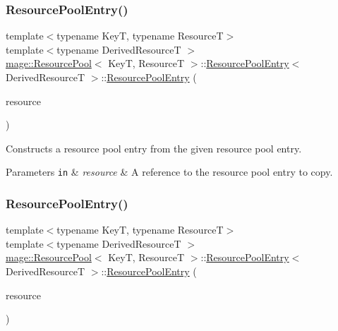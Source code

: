 \subsubsection{\texorpdfstring{Resource\+Pool\+Entry()}{ResourcePoolEntry()}\hspace{0.1cm}{\footnotesize\ttfamily [2/3]}}
{\footnotesize\ttfamily template$<$typename KeyT, typename ResourceT$>$ \\
template$<$typename Derived\+ResourceT $>$ \\
\hyperlink{classmage_1_1_resource_pool}{mage\+::\+Resource\+Pool}$<$ KeyT, ResourceT $>$\+::\hyperlink{structmage_1_1_resource_pool_1_1_resource_pool_entry}{Resource\+Pool\+Entry}$<$ Derived\+ResourceT $>$\+::\hyperlink{structmage_1_1_resource_pool_1_1_resource_pool_entry}{Resource\+Pool\+Entry} (\begin{DoxyParamCaption}\item[{const \hyperlink{structmage_1_1_resource_pool_1_1_resource_pool_entry}{Resource\+Pool\+Entry}$<$ Derived\+ResourceT $>$ \&}]{resource }\end{DoxyParamCaption})\hspace{0.3cm}{\ttfamily [delete]}}

Constructs a resource pool entry from the given resource pool entry.


\begin{DoxyParams}[1]{Parameters}
\mbox{\tt in}  & {\em resource} & A reference to the resource pool entry to copy. \\
\hline
\end{DoxyParams}
\hypertarget{structmage_1_1_resource_pool_1_1_resource_pool_entry_a7e97168b2d81c76dd6dbd6d7037a6243}{}\label{structmage_1_1_resource_pool_1_1_resource_pool_entry_a7e97168b2d81c76dd6dbd6d7037a6243} 
\subsubsection{\texorpdfstring{Resource\+Pool\+Entry()}{ResourcePoolEntry()}\hspace{0.1cm}{\footnotesize\ttfamily [3/3]}}
{\footnotesize\ttfamily template$<$typename KeyT, typename ResourceT$>$ \\
template$<$typename Derived\+ResourceT $>$ \\
\hyperlink{classmage_1_1_resource_pool}{mage\+::\+Resource\+Pool}$<$ KeyT, ResourceT $>$\+::\hyperlink{structmage_1_1_resource_pool_1_1_resource_pool_entry}{Resource\+Pool\+Entry}$<$ Derived\+ResourceT $>$\+::\hyperlink{structmage_1_1_resource_pool_1_1_resource_pool_entry}{Resource\+Pool\+Entry} (\begin{DoxyParamCaption}\item[{\hyperlink{structmage_1_1_resource_pool_1_1_resource_pool_entry}{Resource\+Pool\+Entry}$<$ Derived\+ResourceT $>$ \&\&}]{resource }\end{DoxyParamCaption})\hspace{0.3cm}{\ttfamily [delete]}}

